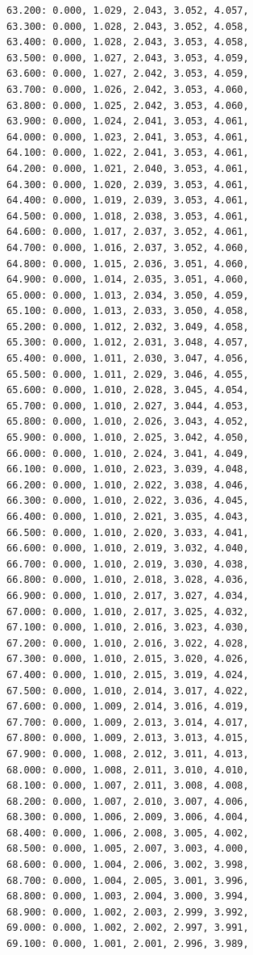 \documentclass[12pt, a4paper]{article}
\begin{document}
\begin{scriptsize}
\begin{ttfamily}
\begin{lstlisting}
63.200: 0.000, 1.029, 2.043, 3.052, 4.057, 
63.300: 0.000, 1.028, 2.043, 3.052, 4.058, 
63.400: 0.000, 1.028, 2.043, 3.053, 4.058, 
63.500: 0.000, 1.027, 2.043, 3.053, 4.059, 
63.600: 0.000, 1.027, 2.042, 3.053, 4.059, 
63.700: 0.000, 1.026, 2.042, 3.053, 4.060, 
63.800: 0.000, 1.025, 2.042, 3.053, 4.060, 
63.900: 0.000, 1.024, 2.041, 3.053, 4.061, 
64.000: 0.000, 1.023, 2.041, 3.053, 4.061, 
64.100: 0.000, 1.022, 2.041, 3.053, 4.061, 
64.200: 0.000, 1.021, 2.040, 3.053, 4.061, 
64.300: 0.000, 1.020, 2.039, 3.053, 4.061, 
64.400: 0.000, 1.019, 2.039, 3.053, 4.061, 
64.500: 0.000, 1.018, 2.038, 3.053, 4.061, 
64.600: 0.000, 1.017, 2.037, 3.052, 4.061, 
64.700: 0.000, 1.016, 2.037, 3.052, 4.060, 
64.800: 0.000, 1.015, 2.036, 3.051, 4.060, 
64.900: 0.000, 1.014, 2.035, 3.051, 4.060, 
65.000: 0.000, 1.013, 2.034, 3.050, 4.059, 
65.100: 0.000, 1.013, 2.033, 3.050, 4.058, 
65.200: 0.000, 1.012, 2.032, 3.049, 4.058, 
65.300: 0.000, 1.012, 2.031, 3.048, 4.057, 
65.400: 0.000, 1.011, 2.030, 3.047, 4.056, 
65.500: 0.000, 1.011, 2.029, 3.046, 4.055, 
65.600: 0.000, 1.010, 2.028, 3.045, 4.054, 
65.700: 0.000, 1.010, 2.027, 3.044, 4.053, 
65.800: 0.000, 1.010, 2.026, 3.043, 4.052, 
65.900: 0.000, 1.010, 2.025, 3.042, 4.050, 
66.000: 0.000, 1.010, 2.024, 3.041, 4.049, 
66.100: 0.000, 1.010, 2.023, 3.039, 4.048, 
66.200: 0.000, 1.010, 2.022, 3.038, 4.046, 
66.300: 0.000, 1.010, 2.022, 3.036, 4.045, 
66.400: 0.000, 1.010, 2.021, 3.035, 4.043, 
66.500: 0.000, 1.010, 2.020, 3.033, 4.041, 
66.600: 0.000, 1.010, 2.019, 3.032, 4.040, 
66.700: 0.000, 1.010, 2.019, 3.030, 4.038, 
66.800: 0.000, 1.010, 2.018, 3.028, 4.036, 
66.900: 0.000, 1.010, 2.017, 3.027, 4.034, 
67.000: 0.000, 1.010, 2.017, 3.025, 4.032, 
67.100: 0.000, 1.010, 2.016, 3.023, 4.030, 
67.200: 0.000, 1.010, 2.016, 3.022, 4.028, 
67.300: 0.000, 1.010, 2.015, 3.020, 4.026, 
67.400: 0.000, 1.010, 2.015, 3.019, 4.024, 
67.500: 0.000, 1.010, 2.014, 3.017, 4.022, 
67.600: 0.000, 1.009, 2.014, 3.016, 4.019, 
67.700: 0.000, 1.009, 2.013, 3.014, 4.017, 
67.800: 0.000, 1.009, 2.013, 3.013, 4.015, 
67.900: 0.000, 1.008, 2.012, 3.011, 4.013, 
68.000: 0.000, 1.008, 2.011, 3.010, 4.010, 
68.100: 0.000, 1.007, 2.011, 3.008, 4.008, 
68.200: 0.000, 1.007, 2.010, 3.007, 4.006, 
68.300: 0.000, 1.006, 2.009, 3.006, 4.004, 
68.400: 0.000, 1.006, 2.008, 3.005, 4.002, 
68.500: 0.000, 1.005, 2.007, 3.003, 4.000, 
68.600: 0.000, 1.004, 2.006, 3.002, 3.998, 
68.700: 0.000, 1.004, 2.005, 3.001, 3.996, 
68.800: 0.000, 1.003, 2.004, 3.000, 3.994, 
68.900: 0.000, 1.002, 2.003, 2.999, 3.992, 
69.000: 0.000, 1.002, 2.002, 2.997, 3.991, 
69.100: 0.000, 1.001, 2.001, 2.996, 3.989, 

\end{lstlisting}
\end{ttfamily}
\end{scriptsize}
\end{document}
